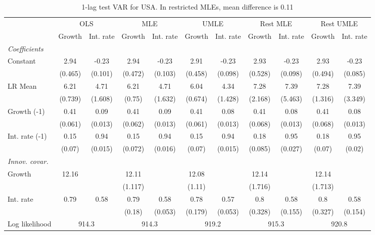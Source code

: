 \begin{table}[htbp] 
	\centering
	\begin{tabular}{@{\extracolsep{4pt}}lcccccccccc@{}}		\hline\hline
		 		 & \multicolumn{2}{c}{OLS} &\multicolumn{2}{c}{MLE} &\multicolumn{2}{c}{UMLE} &\multicolumn{2}{c}{Rest MLE} &\multicolumn{2}{c}{Rest UMLE} \\ 
 		 & Growth 	 & Int. rate 	 & Growth 	 & Int. rate 	 & Growth 	 & Int. rate 	 & Growth 	 & Int. rate 	 & Growth 	 & Int. rate\\\cline{2-3}\cline{4-5}\cline{6-7}\cline{8-9}\cline{10-11}
\rule{0pt}{4ex} 
 \emph{Coefficients} 	  		 & 		 & 		 & 		 & 		 & 		 & 		 & 		 & 		 & 		 &\\ 
\quad Constant 	 & 2.94 	 & -0.23 	 & 2.94 	 & -0.23 	 & 2.91 	 & -0.23 	 & 2.93 	 & -0.23 	 & 2.93 	 & -0.23	 \\ 
 		 & (0.465) 	 & (0.101) 	 & (0.472) 	 & (0.103) 	 & (0.458) 	 & (0.098) 	 & (0.528) 	 & (0.098) 	 & (0.494) 	 & (0.085) 	 \\ 
\quad LR Mean 	 & 6.21 	 & 4.71 	 & 6.21 	 & 4.71 	 & 6.04 	 & 4.34 	 & 7.28 	 & 7.39 	 & 7.28 	 & 7.39	 \\ 
 		 & (0.739) 	 & (1.608) 	 & (0.75) 	 & (1.632) 	 & (0.674) 	 & (1.428) 	 & (2.168) 	 & (5.463) 	 & (1.316) 	 & (3.349) 	 \\ 
\quad Growth (-1) 	 &0.41 	 & 0.09 	 & 0.41 	 & 0.09 	 & 0.41 	 & 0.08 	 & 0.41 	 & 0.08 	 & 0.41 	 & 0.08	 \\ 
 		 & (0.061) 	 & (0.013) 	 & (0.062) 	 & (0.013) 	 & (0.061) 	 & (0.013) 	 & (0.068) 	 & (0.013) 	 & (0.068) 	 & (0.013) 	 \\ 
\quad Int. rate (-1) 	 &0.15 	 & 0.94 	 & 0.15 	 & 0.94 	 & 0.15 	 & 0.94 	 & 0.18 	 & 0.95 	 & 0.18 	 & 0.95	 \\ 
 		 & (0.07) 	 & (0.015) 	 & (0.072) 	 & (0.016) 	 & (0.07) 	 & (0.015) 	 & (0.085) 	 & (0.027) 	 & (0.07) 	 & (0.02) 	 \\ 
\rule{0pt}{4ex} \emph{Innov. covar.}  	 & 	 & 	 & 	 & 	 & 	 & 	 & 	 & 	 & 	 &\\ 
\quad Growth 	 &12.16 	 &  	 & 12.11 	 &  	 & 12.08 	 &  	 & 12.14 	 &  	 & 12.14 	 & 	 \\ 
 		 &  	 &  	 & (1.117) 	 &  	 & (1.11) 	 &  	 & (1.716) 	 &  	 & (1.713) 	 &  	 \\ 
\quad Int. rate 	 &0.79 	 & 0.58 	 & 0.79 	 & 0.58 	 & 0.78 	 & 0.57 	 & 0.8 	 & 0.58 	 & 0.8 	 & 0.58	 \\ 
 		 &  	 &  	 & (0.18) 	 & (0.053) 	 & (0.179) 	 & (0.053) 	 & (0.328) 	 & (0.155) 	 & (0.327) 	 & (0.154) 	 \\ 
 \hline \rule{0pt}{4ex} 
  Log likelihood 	 &\multicolumn{2}{c}{914.3} 	 & \multicolumn{2}{c}{914.3} 	 & \multicolumn{2}{c}{919.2} 	 & \multicolumn{2}{c}{915.3} 	 & \multicolumn{2}{c}{920.8}\\ 

 \hline 	\end{tabular}		\caption{1-lag test VAR for USA. In restricted MLEs, mean difference is 0.11}
		\label{tab:USA1lag}

\end{table}